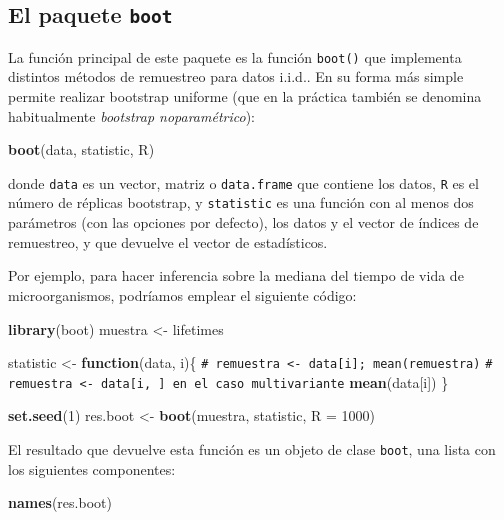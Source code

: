 \documentclass[
  spanish,
  10pt,
]{book}
\newenvironment{Shaded}{\begin{snugshade}}{\end{snugshade}}
\newcommand{\AttributeTok}[1]{\textcolor[rgb]{0.13,0.29,0.53}{#1}}
\newcommand{\CommentTok}[1]{\textcolor[rgb]{0.56,0.35,0.01}{\textit{#1}}}
\newcommand{\ControlFlowTok}[1]{\textcolor[rgb]{0.13,0.29,0.53}{\textbf{#1}}}
\newcommand{\DecValTok}[1]{\textcolor[rgb]{0.00,0.00,0.81}{#1}}
\newcommand{\FunctionTok}[1]{\textcolor[rgb]{0.13,0.29,0.53}{\textbf{#1}}}
\newcommand{\NormalTok}[1]{#1}
\newcommand{\OtherTok}[1]{\textcolor[rgb]{0.56,0.35,0.01}{#1}}
\theoremstyle{break}
\theoremstyle{nonumberplain}
\renewcommand{\CommentTok}[1]{\textcolor[rgb]{0.41,0.41,0.41}{\texttt{#1}}}
\begin{document}
\subsection{\texorpdfstring{El paquete \texttt{boot}}{El paquete boot}}\label{intro-pkgboot}

La función principal de este paquete es la función \texttt{boot()} que implementa distintos métodos de remuestreo para datos i.i.d..
En su forma más simple permite realizar bootstrap uniforme (que en la práctica también se denomina habitualmente \emph{bootstrap noparamétrico}):

\begin{Shaded}
\begin{Highlighting}[]
\FunctionTok{boot}\NormalTok{(data, statistic, R)}
\end{Highlighting}
\end{Shaded}

donde \texttt{data} es un vector, matriz o \texttt{data.frame} que contiene los datos,
\texttt{R} es el número de réplicas bootstrap, y \texttt{statistic} es una función
con al menos dos parámetros (con las opciones por defecto),
los datos y el vector de índices de remuestreo,
y que devuelve el vector de estadísticos.

Por ejemplo, para hacer inferencia sobre la mediana del tiempo de vida de microorganismos,
podríamos emplear el siguiente código:

\begin{Shaded}
\begin{Highlighting}[]
\FunctionTok{library}\NormalTok{(boot)}
\NormalTok{muestra }\OtherTok{\textless{}{-}}\NormalTok{ lifetimes}

\NormalTok{statistic }\OtherTok{\textless{}{-}} \ControlFlowTok{function}\NormalTok{(data, i)\{}
  \CommentTok{\# remuestra \textless{}{-} data[i]; mean(remuestra)}
  \CommentTok{\# remuestra \textless{}{-} data[i, ] en el caso multivariante}
  \FunctionTok{mean}\NormalTok{(data[i])}
\NormalTok{\}}

\FunctionTok{set.seed}\NormalTok{(}\DecValTok{1}\NormalTok{)}
\NormalTok{res.boot }\OtherTok{\textless{}{-}} \FunctionTok{boot}\NormalTok{(muestra, statistic, }\AttributeTok{R =} \DecValTok{1000}\NormalTok{)}
\end{Highlighting}
\end{Shaded}

El resultado que devuelve esta función es un objeto de clase \texttt{boot}, una lista con los siguientes componentes:

\begin{Shaded}
\begin{Highlighting}[]
\FunctionTok{names}\NormalTok{(res.boot)}
\end{Highlighting}
\end{Shaded}
\end{document}
